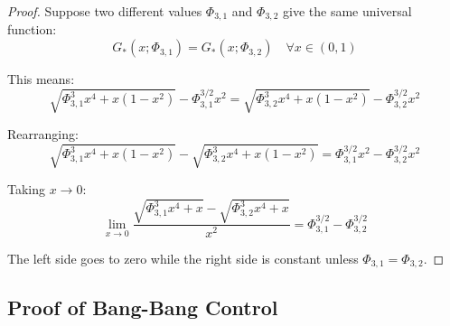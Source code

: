 \documentclass[aps,pre,twocolumn,showpacs,superscriptaddress]{revtex4-2}
\theoremstyle{definition}
\begin{document}
\begin{proof}
Suppose two different values $\Phi_{3,1}$ and $\Phi_{3,2}$ give the same universal function:
\begin{equation}
G_*(x;\Phi_{3,1}) = G_*(x;\Phi_{3,2}) \quad \forall x \in (0,1)
\end{equation}

This means:
\begin{equation}
\sqrt{\Phi_{3,1}^3 x^4 + x(1-x^2)} - \Phi_{3,1}^{3/2} x^2 = \sqrt{\Phi_{3,2}^3 x^4 + x(1-x^2)} - \Phi_{3,2}^{3/2} x^2
\end{equation}

Rearranging:
\begin{equation}
\sqrt{\Phi_{3,1}^3 x^4 + x(1-x^2)} - \sqrt{\Phi_{3,2}^3 x^4 + x(1-x^2)} = \Phi_{3,1}^{3/2} x^2 - \Phi_{3,2}^{3/2} x^2
\end{equation}

Taking $x \to 0$:
\begin{equation}
\lim_{x \to 0} \frac{\sqrt{\Phi_{3,1}^3 x^4 + x} - \sqrt{\Phi_{3,2}^3 x^4 + x}}{x^2} = \Phi_{3,1}^{3/2} - \Phi_{3,2}^{3/2}
\end{equation}

The left side goes to zero while the right side is constant unless $\Phi_{3,1} = \Phi_{3,2}$.
\end{proof}

\subsection{Proof of Bang-Bang Control}
\end{document}
